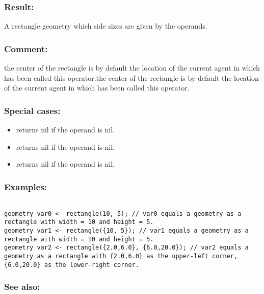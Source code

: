 \documentclass[]{book}
\providecommand{\tightlist}{%
  \setlength{\itemsep}{0pt}\setlength{\parskip}{0pt}}
\theoremstyle{definition}
\theoremstyle{definition}
\theoremstyle{definition}
\theoremstyle{remark}
\begin{document}
\subsubsection{Result:}\label{result-416}

A rectangle geometry which side sizes are given by the operands.

\subsubsection{Comment:}\label{comment-81}

the center of the rectangle is by default the location of the current
agent in which has been called this operator.the center of the rectangle
is by default the location of the current agent in which has been called
this operator.

\subsubsection{Special cases:}\label{special-cases-116}

\begin{itemize}
\tightlist
\item
  returns nil if the operand is nil.\\
\item
  returns nil if the operand is nil.\\
\item
  returns nil if the operand is nil.
\end{itemize}

\subsubsection{Examples:}\label{examples-295}

\begin{verbatim}
 
geometry var0 <- rectangle(10, 5); // var0 equals a geometry as a rectangle with width = 10 and height = 5. 
geometry var1 <- rectangle({10, 5}); // var1 equals a geometry as a rectangle with width = 10 and height = 5. 
geometry var2 <- rectangle({2.0,6.0}, {6.0,20.0}); // var2 equals a geometry as a rectangle with {2.0,6.0} as the upper-left corner, {6.0,20.0} as the lower-right corner.
\end{verbatim}

\subsubsection{See also:}\label{see-also-172}
\end{document}
